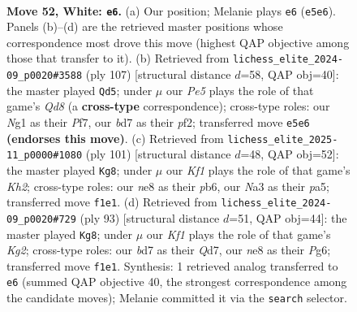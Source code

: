 \documentclass[11pt]{article}
\begin{document}
\clearpage

\begin{figure}[p]\centering
\begin{subfigure}{0.46\textwidth}\centering
\resizebox{\linewidth}{!}{%
\newchessgame
\chessboard[
  setfen={4n1k1/3b4/p7/3PPp1p/6p1/N7/1Q3P2/5KNq w - - 7 52},
  showmover=false,
  pgfstyle=straightmove, color=movearrow, markmove={e5-e6}
]}
\caption{}
\end{subfigure}\hfill
\begin{subfigure}{0.46\textwidth}\centering
\resizebox{\linewidth}{!}{%
\newchessgame
\chessboard[
  setfen={8/4Qp1k/3np2p/8/7P/4P1NK/5P2/3q4 b - - 3 54},
  showmover=false,
  pgfstyle=straightmove, color=movearrow, markmove={d1-d5}
]}
\caption{}
\end{subfigure}
\\[4pt]
\begin{subfigure}{0.46\textwidth}\centering
\resizebox{\linewidth}{!}{%
\newchessgame
\chessboard[
  setfen={8/1p4pk/pP5p/P7/3Pq3/3n1N2/2Q3P1/7K b - - 17 51},
  showmover=false,
  pgfstyle=straightmove, color=movearrow, markmove={h7-g8}
]}
\caption{}
\end{subfigure}\hfill
\begin{subfigure}{0.46\textwidth}\centering
\resizebox{\linewidth}{!}{%
\newchessgame
\chessboard[
  setfen={8/3q2k1/1p4p1/1P1nPpN1/3Q4/8/6PK/8 b - - 3 47},
  showmover=false,
  pgfstyle=straightmove, color=movearrow, markmove={g7-g8}
]}
\caption{}
\end{subfigure}
\caption{\textbf{Move 52, White: \texttt{e6}.} (a) Our position; Melanie plays \texttt{e6} (\texttt{e5e6}). Panels (b)--(d) are the retrieved master positions whose correspondence most drove this move (highest QAP objective among those that transfer to it). (b) Retrieved from \texttt{lichess\_elite\_2024-09\_p0020\#3588} (ply 107) [structural distance $d$=58, QAP obj=40]: the master played \texttt{Qd5}; under $\mu$ our \emph{Pe5} plays the role of that game's \emph{Qd8} (a \textbf{cross-type} correspondence); cross-type roles: our \emph{N}g1 as their \emph{P}f7, our \emph{b}d7 as their \emph{p}f2; transferred move \texttt{e5e6} \textbf{(endorses this move)}. (c) Retrieved from \texttt{lichess\_elite\_2025-11\_p0000\#1080} (ply 101) [structural distance $d$=48, QAP obj=52]: the master played \texttt{Kg8}; under $\mu$ our \emph{Kf1} plays the role of that game's \emph{Kh2}; cross-type roles: our \emph{n}e8 as their \emph{p}b6, our \emph{N}a3 as their \emph{p}a5; transferred move \texttt{f1e1}. (d) Retrieved from \texttt{lichess\_elite\_2024-09\_p0020\#729} (ply 93) [structural distance $d$=51, QAP obj=44]: the master played \texttt{Kg8}; under $\mu$ our \emph{Kf1} plays the role of that game's \emph{Kg2}; cross-type roles: our \emph{b}d7 as their \emph{Q}d7, our \emph{n}e8 as their \emph{P}g6; transferred move \texttt{f1e1}. Synthesis: 1 retrieved analog transferred to \texttt{e6} (summed QAP objective 40, the strongest correspondence among the candidate moves); Melanie committed it via the \texttt{search} selector.}
\label{fig:thought-m102}
\end{figure}
\end{document}
